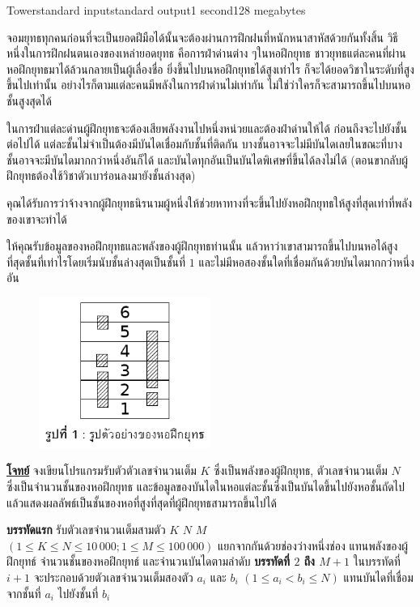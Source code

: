 \documentclass[11pt,a4paper]{article}
\begin{document}
\begin{problem}{Tower}{standard input}{standard output}{1 second}{128 megabytes}

จอมยุทธทุกคนก่อนที่จะเป็นยอดฝีมือได้นั้นจะต้องผ่านการฝึกฝนที่หนักหนาสาหัสด้วยกันทั้งสิ้น วิธีหนึ่งในการฝึกฝนตนเองของเหล่ายอดยุทธ คือการฝ่าด่านต่าง ๆในหอฝึกยุทธ ชาวยุทธแต่ละคนที่ผ่านหอฝึกยุทธมาได้ล้วนกลายเป็นผู้เลื่องชื่อ ยิ่งขึ้นไปบนหอฝึกยุทธได้สูงเท่าไร ก็จะได้ยอดวิชาในระดับที่สูงขึ้นไปเท่านั้น อย่างไรก็ตามแต่ละคนมีพลังในการฝ่าด่านไม่เท่ากัน ไม่ใช่ว่าใครก็จะสามารถขึ้นไปบนหอชั้นสูงสุดได้

ในการฝ่าแต่ละด่านผู้ฝึกยุทธจะต้องเสียพลังงานไปหนึ่งหน่วยและต้องฝ่าด่านให้ได้ ก่อนถึงจะไปยังชั้นต่อไปได้ แต่ละชั้นไม่จำเป็นต้องมีบันไดเชื่อมกับชั้นที่ติดกัน บางชั้นอาจจะไม่มีบันไดเลยในขณะที่บางชั้นอาจจะมีบันไดมากกว่าหนึ่งอันก็ได้ และบันไดทุกอันเป็นบันไดพิเศษที่ขึ้นได้ลงไม่ได้ (ตอนขากลับผู้ฝึกยุทธต้องใช้วิชาตัวเบาร่อนลงมายังชั้นล่างสุด)

คุณได้รับการว่าจ้างจากผู้ฝึกยุทธนิรนามผู้หนึ่งให้ช่วยหาทางที่จะขึ้นไปยังหอฝึกยุทธให้สูงที่สุดเท่าที่พลังของเขาจะทำได้

ให้คุณรับข้อมูลของหอฝึกยุทธและพลังของผู้ฝึกยุทธท่านนั้น แล้วหาว่าเขาสามารถขึ้นไปบนหอได้สูงที่สุดชั้นที่เท่าไรโดยเริ่มนับชั้นล่างสุดเป็นชั้นที่ $1$ และไม่มีหอสองชั้นใดที่เชื่อมกันด้วยบันไดมากกว่าหนึ่งอัน

\begin{figure}[h]
\centering
\includegraphics[width=0.5\textwidth]{../latex/img/1031/1031-1.png}
\end{figure}

\bigskip
\underline{\textbf{โจทย์}}  จงเขียนโปรแกรมรับตัวตัวเลขจำนวนเต็ม $K$ ซึ่งเป็นพลังของผู้ฝึกยุทธ, ตัวเลขจำนวนเต็ม $N$ ซึ่งเป็นจำนวนชั้นของหอฝึกยุทธ และข้อมูลของบันไดในหอแต่ละชั้นซึ่งเป็นบันไดขึ้นไปยังหอชั้นถัดไป แล้วแสดงผลลัพธ์เป็นชั้นของหอที่สูงที่สุดที่ผู้ฝึกยุทธสามารถขึ้นไปได้

\InputFile

\textbf{บรรทัดแรก} รับตัวเลขจำนวนเต็มสามตัว $K$ $N$ $M$ $(1 \leq K \leq N \leq 10\,000; 1 \leq M \leq 100\,000)$ แยกจากกันด้วยช่องว่างหนึ่งช่อง แทนพลังของผู้ฝึกยุทธ์ จำนวนชั้นของหอฝึกยุทธ์ และจำนวนบันไดตามลำดับ
\textbf{บรรทัดที่ $2$ ถึง $M+1$} ในบรรทัดที่ $i+1$ จะประกอบด้วยตัวเลขจำนวนเต็มสองตัว $a_i$ และ $b_i$ $(1 \leq a_i < b_i \leq N)$ แทนบันไดที่เชื่อมจากชั้นที่ $a_i$ ไปยังชั้นที่ $b_i$


\end{problem}
\end{document}
